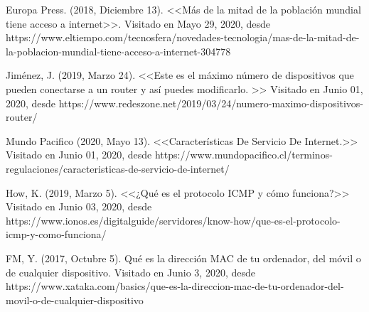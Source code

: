 \documentclass[12pt,letterpaper]{article}
\begin{document}
\newpage
\tableofcontents
\thispagestyle{empty}

\newpage
\renewcommand{\thepage}{\arabic{page}}
\setcounter{page}{1}







\clearpage


\begin{thebibliography}{X}
 Europa Press. (2018, Diciembre 13). <<Más de la mitad de la población mundial tiene acceso a internet>>. Visitado en Mayo 29, 2020, desde https://www.eltiempo.com/tecnosfera/novedades-tecnologia/mas-de-la-mitad-de-la-poblacion-mundial-tiene-acceso-a-internet-304778


 Jiménez, J. (2019, Marzo 24). <<Este es el máximo número de dispositivos que pueden conectarse a un router y así puedes modificarlo. >> Visitado en Junio 01, 2020, desde https://www.redeszone.net/2019/03/24/numero-maximo-dispositivos-router/

 Mundo Pacifico (2020, Mayo 13). <<Características De Servicio De Internet.>> Visitado en Junio 01, 2020, desde https://www.mundopacifico.cl/terminos-regulaciones/caracteristicas-de-servicio-de-internet/

 How, K. (2019, Marzo 5). <<¿Qué es el protocolo ICMP y cómo funciona?>> Visitado en Junio 03, 2020, desde https://www.ionos.es/digitalguide/servidores/know-how/que-es-el-protocolo-icmp-y-como-funciona/

 FM, Y. (2017, Octubre 5). Qué es la dirección MAC de tu ordenador, del móvil o de cualquier dispositivo. Visitado en Junio 3, 2020, desde https://www.xataka.com/basics/que-es-la-direccion-mac-de-tu-ordenador-del-movil-o-de-cualquier-dispositivo

\end{thebibliography}



\nocite{*}
\end{document}
